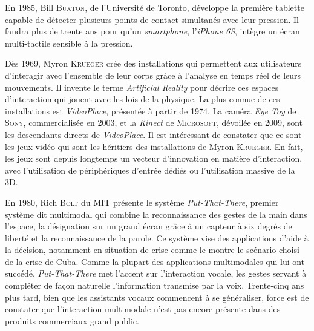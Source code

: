 En 1985, Bill \textsc{Buxton}, de l’Université de Toronto, développe la première tablette capable de détecter plusieurs points de contact simultanés avec leur pression. Il faudra plus de trente ans pour qu’un \textit{smartphone}, l’\textit{iPhone 6S}, intègre un écran multi-tactile sensible à la pression.

Dès 1969, Myron \textsc{Krueger} crée des installations qui permettent aux utilisateurs d'interagir avec l’ensemble de leur corps grâce à l'analyse en temps réel de leurs mouvements. Il invente le terme \textit{Artificial Reality} pour décrire ces espaces d’interaction qui jouent avec les lois de la physique. La plus connue de ces installations est \textit{VideoPlace}, présentée à partir de 1974. La caméra \textit{Eye Toy} de \textsc{Sony}, commercialisée en 2003, et la \textit{Kinect} de \textsc{Microsoft}, dévoilée en 2009, sont les descendants directs de \textit{VideoPlace}. 
Il est intéressant de constater que ce sont les jeux vidéo qui sont les héritiers des installations de Myron \textsc{Krueger}. En fait, les jeux sont depuis longtemps un vecteur d'innovation en matière d'interaction, avec l'utilisation de périphériques d'entrée dédiés ou l'utilisation massive de la 3D.

En 1980, Rich \textsc{Bolt} du MIT présente le système \textit{Put-That-There}, premier système dit multimodal qui combine la reconnaissance des gestes de la main dans l'espace, la désignation sur un grand écran grâce à un capteur à six degrés de liberté et la reconnaissance de la parole. Ce système vise des applications d’aide à la décision, notamment en situation de crise comme le montre le scénario choisi de la crise de Cuba. Comme la plupart des applications multimodales qui lui ont succédé, \textit{Put-That-There} met l’accent sur l’interaction vocale, les gestes servant à compléter de façon naturelle l’information transmise par la voix. 
Trente-cinq ans plus tard, bien que les assistants vocaux commencent à se généraliser, force est de constater que l’interaction multimodale n’est pas encore présente dans des produits commerciaux grand public.

